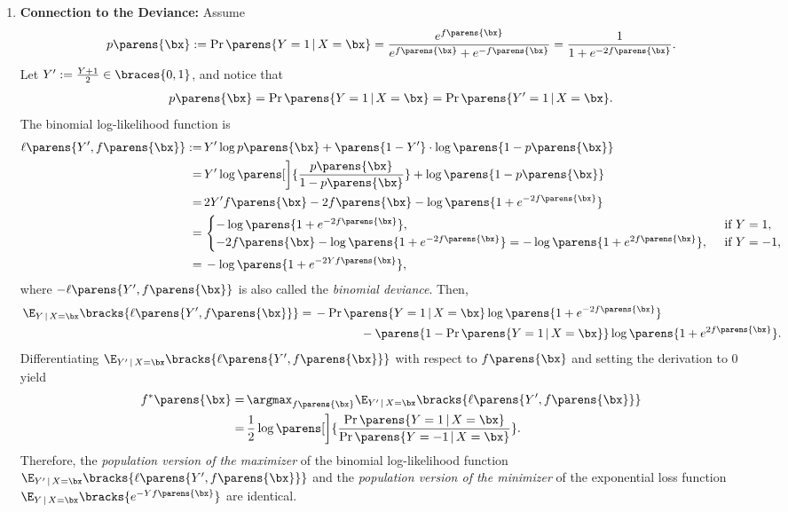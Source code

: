 \documentclass[12pt]{article}
\begin{document}
\begin{enumerate}[label=\textbf{\arabic*.}]
	\item \textbf{Connection to the Deviance:} Assume 
	\begin{align*}
		p \parens{\bx} := \Pr \parens{Y = 1 \,\vert\, X = \bx} = \frac{e^{f \parens{\bx}}}{e^{ f \parens{\bx} } + e^{-f \parens{\bx} }} = \frac{1}{1 + e^{-2 f \parens{\bx}}}. 
	\end{align*}
	Let $Y' := \frac{Y+1}{2} \in \braces{0, 1}$, and notice that 
	\begin{align*}
		p \parens{\bx} = \Pr \parens{Y = 1 \,\vert\, X = \bx} = \Pr \parens{Y' = 1 \,\vert\, X = \bx}. 
	\end{align*}
	The binomial log-likelihood function is 
	\begin{align*}
		\ell \parens{Y', f \parens{\bx} } := & \, Y' \log p \parens{\bx} + \parens{1 - Y'} \cdot \log \parens{1 - p \parens{\bx} } \\ 
		= & \, Y' \log \parens[\bigg]{\frac{p \parens{\bx}}{1 - p \parens{\bx}}} + \log \parens{1 - p \parens{\bx}} \\ 
		= & \, 2 Y' f \parens{\bx} - 2 f \parens{\bx} - \log \parens{1 + e^{-2f\parens{\bx}}} \\ 
		= & \, \begin{cases}
			- \log \parens{1 + e^{-2f \parens{\bx}}}, & \, \text{ if } Y = 1, \\ 
			-2 f \parens{\bx} - \log \parens{1 + e^{-2f \parens{\bx}}} = - \log \parens{1 + e^{2f \parens{\bx}}}, & \, \text{ if } Y = -1, 
		\end{cases} \\ 
		= & \, - \log \parens{1 + e^{-2 Y f \parens{\bx}}}, 
	\end{align*}
	where $- \ell \parens{Y', f \parens{\bx} }$ is also called the \emph{binomial deviance}. 
	Then, 
	\begin{align*}
		\E_{Y \,\vert\, X = \bx} \bracks{\ell \parens{Y', f \parens{\bx} }} = & \, - \Pr \parens{Y = 1 \,\vert\, X = \bx} \log \parens{1 + e^{-2 f \parens{\bx}}} \\ 
		& \qquad \qquad - \parens{1 - \Pr \parens{Y = 1 \,\vert\, X = \bx} } \log \parens{1 + e^{2 f \parens{\bx}}}. 
	\end{align*}
	Differentiating $\E_{Y' \,\vert\, X = \bx} \bracks{\ell \parens{Y', f \parens{\bx} }}$ with respect to $f \parens{\bx}$ and setting the derivation to 0 yield 
	\begin{align*}
		f^* \parens{\bx} = & \, \argmax_{f \parens{\bx}} \E_{Y' \,\vert\, X = \bx} \bracks{\ell \parens{Y', f \parens{\bx} }} \\ 
		= & \, \frac{1}{2} \log \parens[\bigg]{\frac{\Pr \parens{Y = 1 \,\vert\, X = \bx}}{\Pr \parens{Y = -1 \,\vert\, X = \bx}}}. 
	\end{align*}
	Therefore, the \textit{population version of the maximizer} of the binomial log-likelihood function $\E_{Y' \,\vert\, X = \bx} \bracks{\ell \parens{Y', f \parens{\bx} } }$ and the \textit{population version of the minimizer} of the exponential loss function $\E_{Y \,\vert\, X = \bx} \bracks{e^{- Y f \parens{\bx}}}$ are identical. 
	

\end{enumerate}
\end{document}
